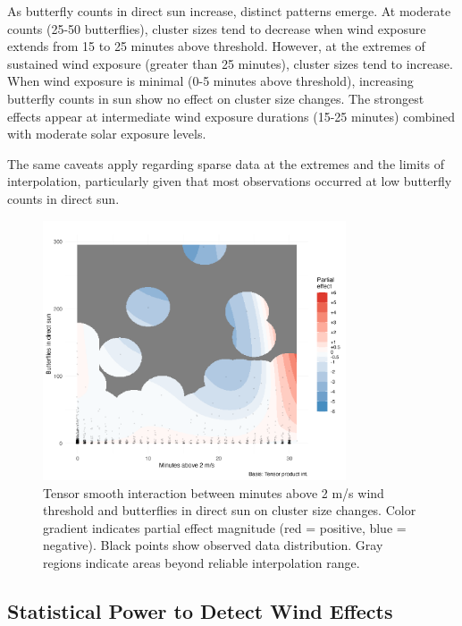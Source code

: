 As butterfly counts in direct sun increase, distinct patterns emerge. At moderate counts (25-50 butterflies), cluster sizes tend to decrease when wind exposure extends from 15 to 25 minutes above threshold. However, at the extremes of sustained wind exposure (greater than 25 minutes), cluster sizes tend to increase. When wind exposure is minimal (0-5 minutes above threshold), increasing butterfly counts in sun show no effect on cluster size changes. The strongest effects appear at intermediate wind exposure durations (15-25 minutes) combined with moderate solar exposure levels.

The same caveats apply regarding sparse data at the extremes and the limits of interpolation, particularly given that most observations occurred at low butterfly counts in direct sun.

\begin{figure}[htbp]
    \centering
    \includegraphics[width=0.8\textwidth]{supplemental/results/30_min_threshold/figures/interaction_wind_x_sun_binned.png}
    \caption[Wind threshold × sunlight interaction]{Tensor smooth interaction between minutes above 2 m/s wind threshold and butterflies in direct sun on cluster size changes. Color gradient indicates partial effect magnitude (red = positive, blue = negative). Black points show observed data distribution. Gray regions indicate areas beyond reliable interpolation range.}
    \label{fig:threshold_interaction}
\end{figure} 

\subsection{Statistical Power to Detect Wind Effects}

